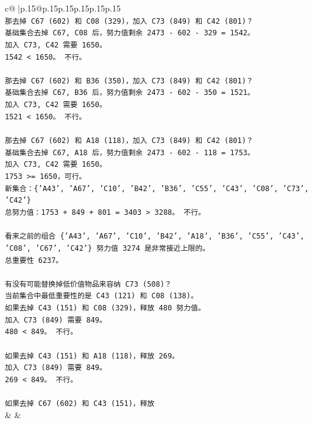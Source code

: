 \documentclass{article}
\begin{document}
{\begin{supertabular}{c@{$\;$}|p{.15\linewidth}@{}p{.15\linewidth}p{.15\linewidth}p{.15\linewidth}p{.15\linewidth}p{.15\linewidth}}
{{{\\ 
\texttt{那去掉 C67 (602) 和 C08 (329)，加入 C73 (849) 和 C42 (801)？} \\
\texttt{基础集合去掉 C67, C08 后，努力值剩余 2473 {-} 602 {-} 329 = 1542。} \\
\texttt{加入 C73, C42 需要 1650。} \\
\texttt{1542 < 1650。 不行。} \\
\\ 
\texttt{那去掉 C67 (602) 和 B36 (350)，加入 C73 (849) 和 C42 (801)？} \\
\texttt{基础集合去掉 C67, B36 后，努力值剩余 2473 {-} 602 {-} 350 = 1521。} \\
\texttt{加入 C73, C42 需要 1650。} \\
\texttt{1521 < 1650。 不行。} \\
\\ 
\texttt{那去掉 C67 (602) 和 A18 (118)，加入 C73 (849) 和 C42 (801)？} \\
\texttt{基础集合去掉 C67, A18 后，努力值剩余 2473 {-} 602 {-} 118 = 1753。} \\
\texttt{加入 C73, C42 需要 1650。} \\
\texttt{1753 >= 1650，可行。} \\
\texttt{新集合：\{'A43', 'A67', 'C10', 'B42', 'B36', 'C55', 'C43', 'C08', 'C73', 'C42'\}} \\
\texttt{总努力值：1753 + 849 + 801 = 3403 > 3288。 不行。} \\
\\ 
\texttt{看来之前的组合 \{'A43', 'A67', 'C10', 'B42', 'A18', 'B36', 'C55', 'C43', 'C08', 'C67', 'C42'\} 努力值 3274 是非常接近上限的。} \\
\texttt{总重要性 6237。} \\
\\ 
\texttt{有没有可能替换掉低价值物品来容纳 C73 (508)？} \\
\texttt{当前集合中最低重要性的是 C43 (121) 和 C08 (138)。} \\
\texttt{如果去掉 C43 (151) 和 C08 (329)，释放 480 努力值。} \\
\texttt{加入 C73 (849) 需要 849。} \\
\texttt{480 < 849。 不行。} \\
\\ 
\texttt{如果去掉 C43 (151) 和 A18 (118)，释放 269。} \\
\texttt{加入 C73 (849) 需要 849。} \\
\texttt{269 < 849。 不行。} \\
\\ 
\texttt{如果去掉 C67 (602) 和 C43 (151)，释放} \\
            }
        }
    }
    & & \\ \\


\end{supertabular}}
\end{document}
